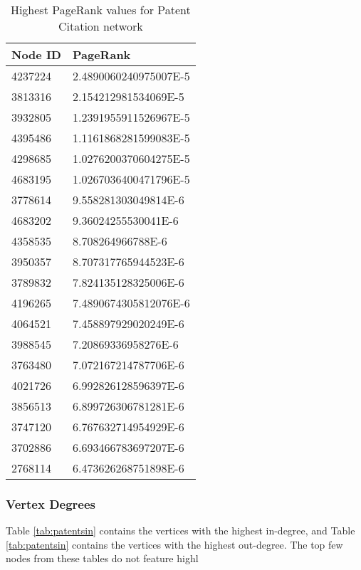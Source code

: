 \begin{table}[htbp]%
\centering
\begin{tabular}{|l|l|}
\hline
Node ID & PageRank \\
\hline
4237224 & 2.4890060240975007E-5 \\
3813316 & 2.154212981534069E-5 \\
3932805 & 1.2391955911526967E-5 \\
4395486 & 1.1161868281599083E-5 \\
4298685 & 1.0276200370604275E-5 \\
4683195 & 1.0267036400471796E-5 \\
3778614 & 9.558281303049814E-6 \\
4683202 & 9.36024255530041E-6 \\
4358535 & 8.708264966788E-6 \\
3950357 & 8.707317765944523E-6 \\
3789832 & 7.824135128325006E-6 \\
4196265 & 7.4890674305812076E-6 \\
4064521 & 7.458897929020249E-6 \\
3988545 & 7.20869336958276E-6 \\
3763480 & 7.072167214787706E-6 \\
4021726 & 6.992826128596397E-6 \\
3856513 & 6.899726306781281E-6 \\
3747120 & 6.767632714954929E-6 \\
3702886 & 6.693466783697207E-6 \\
2768114 & 6.473626268751898E-6 \\
\hline
\end{tabular}
\caption{Highest PageRank values for Patent Citation network}
\label{tab:patentspr}
\end{table}

\subsubsection{Vertex Degrees}
Table \ref{tab:patentsin} contains the vertices with the highest in-degree, and Table \ref{tab:patentsin} contains the vertices with the highest out-degree. The top few nodes from these tables do not feature highl


